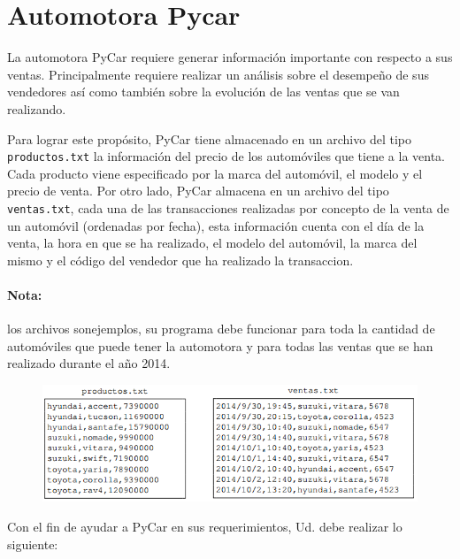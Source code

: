 \section{Automotora Pycar}

La automotora PyCar requiere generar información importante con respecto a sus ventas.
Principalmente requiere realizar un análisis sobre el desempeño de sus vendedores así como también sobre la evolución de las ventas que se van realizando.

Para lograr este propósito, PyCar tiene almacenado en un archivo del tipo \texttt{productos.txt} la información del precio de los automóviles que tiene a la venta. Cada producto viene especificado por la marca del automóvil, el modelo y el precio de venta. Por otro lado, PyCar almacena en un archivo del tipo \texttt{ventas.txt}, cada una de las transacciones realizadas por concepto de la venta
de un automóvil (ordenadas por fecha), esta información cuenta con el día de la venta, la hora en que se ha realizado, el modelo del automóvil, la marca del mismo y el código del vendedor que ha realizado la transaccion. 

\paragraph{Nota:} los archivos sonejemplos, su programa debe funcionar para toda la cantidad de automóviles que puede tener la automotora y para todas las ventas que se han realizado durante el año 2014.

\begin{figure}[h]
    \centering
    \includegraphics[scale=0.8]{Imagenes/autos.png}
\end{figure}

Con el fin de ayudar a PyCar en sus requerimientos, Ud. debe realizar lo siguiente:

